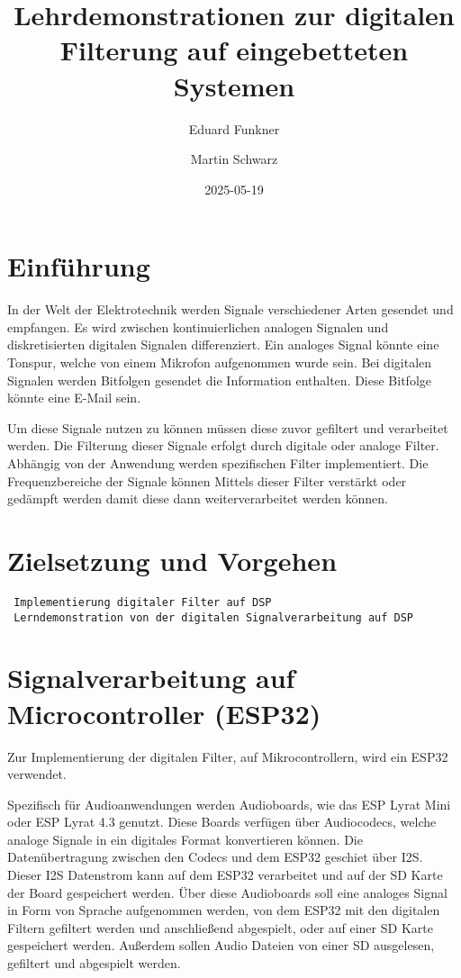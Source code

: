 \documentclass[
  ngerman,
  letterpaper,
  DIV=11]{scrreprt}
\title{Lehrdemonstrationen zur digitalen Filterung auf eingebetteten
Systemen}
\author{Eduard Funkner \and Martin Schwarz}
\date{2025-05-19}
\renewcommand*\contentsname{Inhaltsverzeichnis}
\newcommand\contentsname{Inhaltsverzeichnis}
\begin{document}
\maketitle

\renewcommand*\contentsname{Inhaltsverzeichnis}
{
\hypersetup{linkcolor=}
\setcounter{tocdepth}{2}
\tableofcontents
}

\chapter{Einführung}\label{einfuxfchrung}

In der Welt der Elektrotechnik werden Signale verschiedener Arten
gesendet und empfangen. Es wird zwischen kontinuierlichen analogen
Signalen und diskretisierten digitalen Signalen differenziert. Ein
analoges Signal könnte eine Tonspur, welche von einem Mikrofon
aufgenommen wurde sein. Bei digitalen Signalen werden Bitfolgen gesendet
die Information enthalten. Diese Bitfolge könnte eine E-Mail sein.

Um diese Signale nutzen zu können müssen diese zuvor gefiltert und
verarbeitet werden. Die Filterung dieser Signale erfolgt durch digitale
oder analoge Filter. Abhängig von der Anwendung werden spezifischen
Filter implementiert. Die Frequenzbereiche der Signale können Mittels
dieser Filter verstärkt oder gedämpft werden damit diese dann
weiterverarbeitet werden können.

\chapter{Zielsetzung und Vorgehen}\label{zielsetzung-und-vorgehen}

\begin{verbatim}
 Implementierung digitaler Filter auf DSP
 Lerndemonstration von der digitalen Signalverarbeitung auf DSP
\end{verbatim}

\chapter{Signalverarbeitung auf Microcontroller
(ESP32)}\label{signalverarbeitung-auf-microcontroller-esp32}

Zur Implementierung der digitalen Filter, auf Mikrocontrollern, wird ein
ESP32 verwendet.

Spezifisch für Audioanwendungen werden Audioboards, wie das ESP Lyrat
Mini oder ESP Lyrat 4.3 genutzt. Diese Boards verfügen über Audiocodecs,
welche analoge Signale in ein digitales Format konvertieren können. Die
Datenübertragung zwischen den Codecs und dem ESP32 geschiet über I2S.
Dieser I2S Datenstrom kann auf dem ESP32 verarbeitet und auf der SD
Karte der Board gespeichert werden. Über diese Audioboards soll eine
analoges Signal in Form von Sprache aufgenommen werden, von dem ESP32
mit den digitalen Filtern gefiltert werden und anschließend abgespielt,
oder auf einer SD Karte gespeichert werden. Außerdem sollen Audio
Dateien von einer SD ausgelesen, gefiltert und abgespielt werden.
\end{document}
